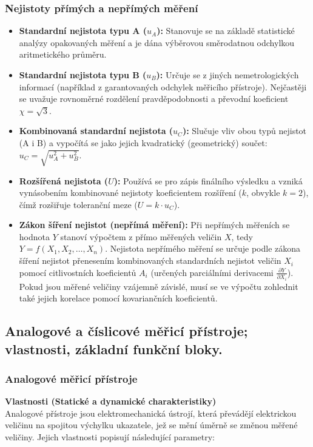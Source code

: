     \subsubsection{Nejistoty přímých a nepřímých měření}
        \begin{itemize}
            \item \textbf{Standardní nejistota typu A ($u_A$):} Stanovuje se na základě statistické analýzy opakovaných měření a je dána výběrovou směrodatnou odchylkou aritmetického průměru.
            \item \textbf{Standardní nejistota typu B ($u_B$):} Určuje se z jiných nemetrologických informací (například z garantovaných odchylek měřicího přístroje). Nejčastěji se uvažuje rovnoměrné rozdělení pravděpodobnosti a převodní koeficient $\chi = \sqrt{3}$.
            \item \textbf{Kombinovaná standardní nejistota ($u_C$):} Slučuje vliv obou typů nejistot (A i B) a vypočítá se jako jejich kvadratický (geometrický) součet: $u_C = \sqrt{u_A^2 + u_B^2}$.
            \item \textbf{Rozšířená nejistota ($U$):} Používá se pro zápis finálního výsledku a vzniká vynásobením kombinované nejistoty koeficientem rozšíření ($k$, obvykle $k = 2$), čímž rozšiřuje toleranční meze ($U = k \cdot u_C$).
            \item \textbf{Zákon šíření nejistot (nepřímá měření):} Při nepřímých měřeních se hodnota $Y$ stanoví výpočtem z přímo měřených veličin $X$, tedy $Y = f(X_1, X_2, \dots, X_n)$. Nejistota nepřímého měření se určuje podle zákona šíření nejistot přenesením kombinovaných standardních nejistot veličin $X_i$ pomocí citlivostních koeficientů $A_i$ (určených parciálními derivacemi $\frac{\partial Y}{\partial X_i}$). Pokud jsou měřené veličiny vzájemně závislé, musí se ve výpočtu zohlednit také jejich korelace pomocí kovariančních koeficientů.
        \end{itemize}
\subsection{Analogové a číslicové měřicí přístroje; vlastnosti, základní funkční bloky.}
    \subsubsection{Analogové měřicí přístroje}
        \textbf{Vlastnosti (Statické a dynamické charakteristiky)}\\
        Analogové přístroje jsou elektromechanická ústrojí, která převádějí elektrickou veličinu na spojitou výchylku ukazatele, jež se mění úměrně se změnou měřené veličiny. Jejich vlastnosti popisují následující parametry:
        
